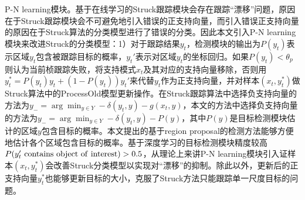 P-N learning模块。基于在线学习的Struck跟踪模块会存在跟踪``漂移''问题，原因在于Struck跟踪模块会不可避免地引入错误的正支持向量，而引入错误正支持向量的原因在于Struck算法的分类模型进行了错误的分类。因此本文引入P-N learning模块来改进Struck的分类模型：1）对于跟踪结果$y_t$，检测模块的输出为$P(y_t)$表示区域$y_t$包含被跟踪目标的概率，$y_t'$表示对区域$y_t$的坐标回归。如果$P(y_t)<\theta_p$则认为当前桢跟踪失败，将支持模式$x_t$及其对应的支持向量移除，否则用$y_t^*=P(y_t)y_t + (1-P(y_t))y_t'$来代替$y_t$作为正支持向量，并对样本$(x_t,y_t^*)$做Struck算法中的ProcessOld模型更新操作。在Struck跟踪算法中选择负支持向量的方法为$y_-=\arg\min_{y \in Y} -\delta(y_t, y) - g(x_t, y)$，本文的方法中选择负支持向量的方法为$y_-=\arg\min_{y\in Y} -\delta(y_t,y) - P(y)$，其中$P(y)$是目标检测模块估计的区域$y$包含目标的概率。本文提出的基于region proposal的检测方法能够方便地估计各个区域包含目标的概率。基于深度学习的目标检测模块精度较高$P(y_t'\ \rm{contains\ object\ of\ interest})>0.5$，从理论上来讲P-N learning模块引入证样本$(x_t, y_t^*)$会改善Struck分类模型以实现对``漂移''的抑制。除此以外，更新后的正支持向量$y_t^*$也能够更新目标的大小，克服了Struck方法只能跟踪单一尺度目标的问题。


